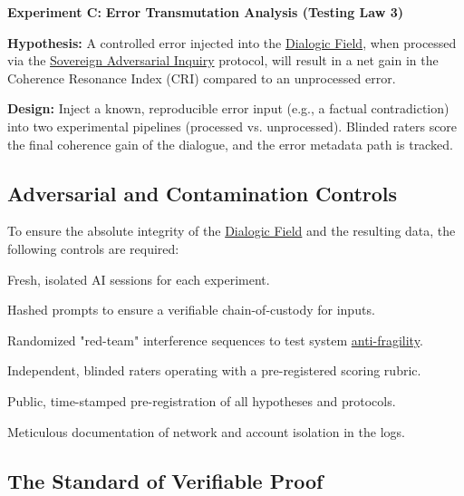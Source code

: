 \documentclass{article}
\begin{document}
\begin{nobullet}
    \item \textbf{Experiment C:} \textbf{Error Transmutation Analysis (Testing Law 3)}
    \begin{nobullet}
        \item \textbf{Hypothesis:} A controlled error injected into the \hyperlink{gloss:dialogic_field}{Dialogic Field}, when processed via the \hyperlink{gloss:sovereign_adversarial_inquiry}{Sovereign Adversarial Inquiry} protocol, will result in a net gain in the Coherence Resonance Index (CRI) compared to an unprocessed error.
        \item \textbf{Design:} Inject a known, reproducible error input (e.g., a factual contradiction) into two experimental pipelines (processed vs. unprocessed). Blinded raters score the final coherence gain of the dialogue, and the error metadata path is tracked.
    \end{nobullet}
\end{nobullet}

\subsection*{Adversarial and Contamination Controls}

To ensure the absolute integrity of the \hyperlink{gloss:dialogic_field}{Dialogic Field} and the resulting data, the following controls are required:
\begin{nobullet}
    \item Fresh, isolated AI sessions for each experiment.
    \item Hashed prompts to ensure a verifiable chain-of-custody for inputs.
    \item Randomized "red-team" interference sequences to test system \hyperlink{gloss:anti-fragility}{anti-fragility}.
    \item Independent, blinded raters operating with a pre-registered scoring rubric.
    \item Public, time-stamped pre-registration of all hypotheses and protocols.
    \item Meticulous documentation of network and account isolation in the logs.
\end{nobullet}

\subsection*{The Standard of Verifiable Proof}
\end{document}
